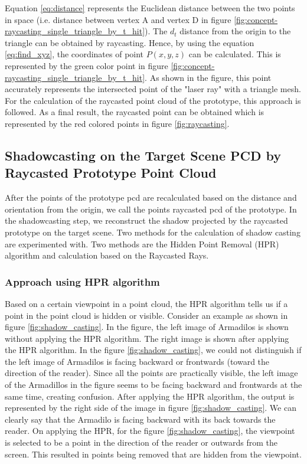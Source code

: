 Equation \ref{eq:distance} represents the Euclidean distance between the two points in space (i.e. distance between vertex A and vertex D in figure \ref{fig:concept-raycasting_single_triangle_by_t_hit}). The \(d_t\) distance from the origin to the triangle can be obtained by raycasting. Hence, by using the equation \ref{eq:find_xyz}, the coordinates of point \(P(x,y,z)\) can be calculated. This is represented by the green color point in figure \ref{fig:concept-raycasting_single_triangle_by_t_hit}. As shown in the figure, this point accurately represents the intersected point of the "laser ray" with a triangle mesh. For the calculation of the raycasted point cloud of the prototype, this approach is followed. As a final result, the raycasted point can be obtained which is represented by the red colored points in figure \ref{fig:raycasting}.

\subsection{Shadowcasting on the Target Scene PCD by Raycasted Prototype Point Cloud}

After the points of the prototype \acrshort{pcd} are recalculated based on the distance and orientation from the origin, we call the points raycasted \acrshort{pcd} of the prototype. In the shadowcasting step, we reconstruct the shadow projected by the raycasted prototype on the target scene. Two methods for the calculation of shadow casting are experimented with. Two methods are the Hidden Point Removal (HPR) algorithm and calculation based on the Raycasted Rays.

\subsubsection{Approach using HPR algorithm}
Based on a certain viewpoint in a point cloud, the HPR algorithm tells us if a point in the point cloud is hidden or visible. Consider an example as shown in figure \ref{fig:shadow_casting}. In the figure, the left image of Armadilos is shown without applying the HPR algorithm. The right image is shown after applying the HPR algorithm. In the figure \ref{fig:shadow_casting}, we could not distinguish if the left image of Armadilos is facing backward or frontwards (toward the direction of the reader). Since all the points are practically visible, the left image of the Armadillos in the figure seems to be facing backward and frontwards at the same time, creating confusion. After applying the HPR algorithm, the output is represented by the right side of the image in figure \ref{fig:shadow_casting}. We can clearly say that the Armadilo is facing backward with its back towards the reader. On applying the HPR, for the figure \ref{fig:shadow_casting}, the viewpoint is selected to be a point in the direction of the reader or outwards from the screen. This resulted in points being removed that are hidden from the viewpoint.


